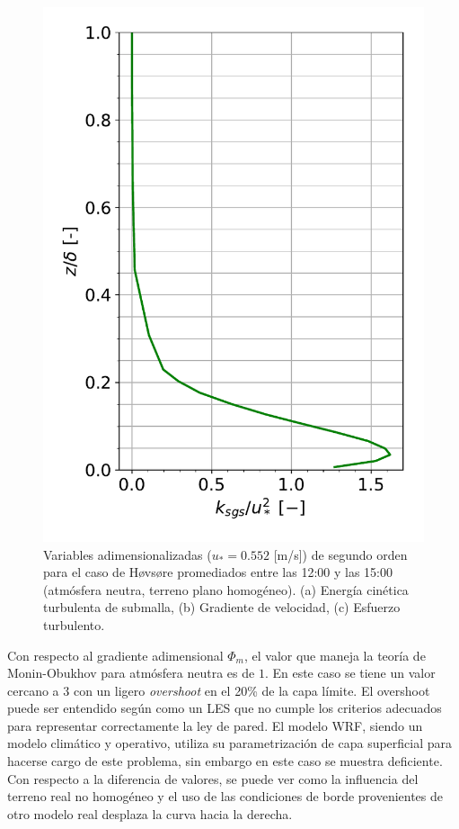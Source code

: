 \begin{figure}[H]
\begin{center}
	\includegraphics[height=0.5\linewidth,page=3,trim={12mm 5mm 3mm 0mm},clip]{Imagenes/06/hov/mean_data}%
	\end{center}
	\caption{Variables adimensionalizadas ($u_* = 0.552$ [m/s]) de segundo orden para el caso de Høvsøre promediados entre las 12:00 y las 15:00 (atmósfera neutra, terreno plano homogéneo). (a) Energía cinética turbulenta de submalla, (b) Gradiente de velocidad, (c) Esfuerzo turbulento. }
	\label{fig:06_hov_mean_secondorder}
\end{figure}

Con respecto al gradiente adimensional $\Phi_m$, el valor que maneja la teoría de Monin-Obukhov para atmósfera neutra es de $1$. En este caso se tiene un valor cercano a $3$ con un ligero \emph{overshoot} en el 20\% de la capa límite. El overshoot puede ser entendido según \cite{doi:10.1063/1.3319073} como un LES que no cumple los criterios adecuados para representar correctamente la ley de pared. El modelo WRF, siendo un modelo climático y operativo, utiliza su parametrización de capa superficial para hacerse cargo de este problema, sin embargo en este caso se muestra deficiente. Con respecto a la diferencia de valores, se puede ver como la influencia del terreno real no homogéneo y el uso de las condiciones de borde provenientes de otro modelo real desplaza la curva hacia la derecha.

